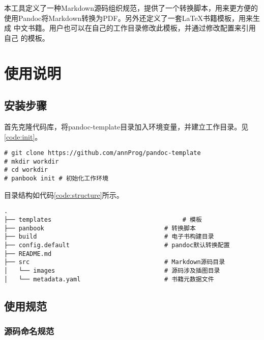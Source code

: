 \documentclass[cn]{elegantbook}
\begin{document}
本工具定义了一种Markdown源码组织规范，提供了一个转换脚本，用来更方便的
使用Pandoc将Markdown转换为PDF。另外还定义了一套LaTeX书籍模板，用来生成
中文书籍。用户也可以在自己的工作目录修改此模板，并通过修改配置来引用自己
的模板。

\mainmatter
\hypersetup{pageanchor=true}

\hypertarget{ux4f7fux7528ux8bf4ux660e}{%
\chapter{使用说明}\label{ux4f7fux7528ux8bf4ux660e}}

\hypertarget{ux5b89ux88c5ux6b65ux9aa4}{%
\section{安装步骤}\label{ux5b89ux88c5ux6b65ux9aa4}}

首先克隆代码库，将pandoc-template目录加入环境变量，并建立工作目录。见\ref{code:init}。

\begin{lstlisting}[caption=初始化工作环境, label=code:init, float=htbp]
# git clone https://github.com/annProg/pandoc-template
# mkdir workdir
# cd workdir
# panbook init # 初始化工作环境
\end{lstlisting}

目录结构如代码\ref{code:structure}所示。

\begin{lstlisting}[caption=目录规范, label=code:structure, float=htbp]
.
├── templates                                    # 模板
├── panbook                                 # 转换脚本
├── build                                   # 电子书构建目录
├── config.default                          # pandoc默认转换配置
├── README.md
├── src                                     # Markdown源码目录
│   └── images                              # 源码涉及插图目录
│   └── metadata.yaml                       # 书籍元数据文件
\end{lstlisting}

\hypertarget{ux4f7fux7528ux89c4ux8303}{%
\section{使用规范}\label{ux4f7fux7528ux89c4ux8303}}

\hypertarget{ux6e90ux7801ux547dux540dux89c4ux8303}{%
\subsection{源码命名规范}\label{ux6e90ux7801ux547dux540dux89c4ux8303}}
\end{document}
